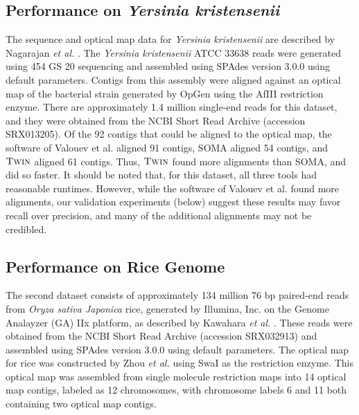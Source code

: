 


\subsection{Performance on \emph{Yersinia kristensenii}} \label{sec:pro_genome}

The sequence and optical map data for  \emph{Yersinia kristensenii} are described by Nagarajan {\em et al.} \cite{Nagarajan08}.  The \emph{Yersinia kristensenii} ATCC 33638 reads were generated using 454 GS 20 sequencing and assembled using SPAdes version 3.0.0 \cite{spades} using default parameters.   Contigs from this assembly were aligned against an optical map of the bacterial strain generated by OpGen using the AfIII restriction enzyme.  There are approximately 1.4 million single-end reads for this dataset, and they were obtained from the NCBI Short Read Archive (accession SRX013205).  Of the 92 contigs that could be aligned to the optical map, the software of  Valouev et al. aligned 91 contigs, SOMA aligned 54 contigs, and $\mbox{\rm {\sc Twin}}$ aligned 61 contigs.  Thus, $\mbox{\rm {\sc Twin}}$ found more alignments than SOMA, and did so faster. It should be noted that, for this dataset, all three tools had reasonable runtimes. However, while the software of Valouev et al. found more alignments, our validation experiments (below) suggest these results may favor recall over precision, and many of the additional alignments may not be credibled.  


\subsection{Performance on Rice Genome} \label{section:rice}

The second dataset consists of approximately 134 million 76 bp paired-end reads from {\em Oryza sativa Japonica} rice, generated by Illumina, Inc. on the Genome Analayzer (GA) IIx platform, as described by Kawahara {\em et al.} \cite{kawahara2013improvement}.   These reads were obtained from the NCBI Short Read Archive (accession SRX032913) and assembled using SPAdes version 3.0.0 \cite{spades} using default parameters.  The optical map for rice was constructed by Zhou {\em et al.} \cite{RICE} using SwaI as the restriction enzyme.  This optical map was assembled from single molecule restriction maps into 14 optical map contigs, labeled as 12 chromosomes, with chromosome labels 6 and 11 both containing two optical map contigs.

